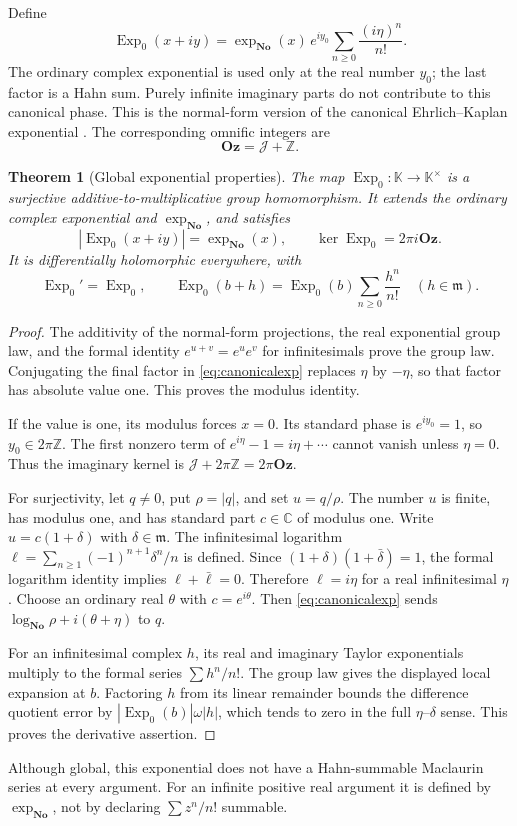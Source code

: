 \documentclass[11pt,oneside]{article}
\numberwithin{equation}{section}
\newtheorem{theorem}{Theorem}[section]
\theoremstyle{definition}
\theoremstyle{remark}\newtheorem{remark}[theorem]{Remark}
\newcommand{\No}{\mathbf{No}}
\newcommand{\Oz}{\mathbf{Oz}}
\newcommand{\K}{\mathbb K}
\newcommand{\C}{\mathbb C}
\newcommand{\Z}{\mathbb Z}
\newcommand{\m}{\mathfrak m}
\newcommand{\Exp}{\operatorname{Exp}}
\begin{document}
Define
\begin{equation}\label{eq:canonicalexp}
 \Exp_0(x+iy)
  =\exp_{\No}(x)\,e^{iy_0}
       \sum_{n\geq0}\frac{(i\eta)^n}{n!}.
\end{equation}
The ordinary complex exponential is used only at the real number $y_0$;
the last factor is a Hahn sum. Purely infinite imaginary parts do not
contribute to this canonical phase. This is the normal-form version of
the canonical Ehrlich--Kaplan exponential \cite[Theorem 11.1]{EK}.
The corresponding omnific integers are
\[
 \Oz=\mathcal J+\Z.
\]

\begin{theorem}[Global exponential properties]\label{thm:exp}
The map $\Exp_0:\K\to\K^\times$ is a surjective additive-to-multiplicative
group homomorphism. It extends the ordinary complex exponential and
$\exp_{\No}$, and satisfies
\begin{equation}\label{eq:exp-props}
 |\Exp_0(x+iy)|=\exp_{\No}(x),\qquad
 \ker\Exp_0=2\pi i\Oz.
\end{equation}
It is differentially holomorphic everywhere, with
\[
 \Exp_0'=\Exp_0,
 \qquad
 \Exp_0(b+h)=\Exp_0(b)\sum_{n\geq0}\frac{h^n}{n!}
 \quad(h\in\m).
\]
\end{theorem}
\begin{proof}
The additivity of the normal-form projections, the real exponential group
law, and the formal identity $e^{u+v}=e^ue^v$ for infinitesimals prove
the group law. Conjugating the final factor in \eqref{eq:canonicalexp}
replaces $\eta$ by $-\eta$, so that factor has absolute value one.
This proves the modulus identity.

If the value is one, its modulus forces $x=0$. Its standard phase is
$e^{iy_0}=1$, so $y_0\in2\pi\Z$. The first nonzero term of
$e^{i\eta}-1=i\eta+\cdots$ cannot vanish unless $\eta=0$.
Thus the imaginary kernel is $\mathcal J+2\pi\Z=2\pi\Oz$.

For surjectivity, let $q\ne0$, put $\rho=|q|$, and set $u=q/\rho$.
The number $u$ is finite, has modulus one, and has standard part
$c\in\C$ of modulus one. Write $u=c(1+\delta)$ with $\delta\in\m$.
The infinitesimal logarithm
$\ell=\sum_{n\geq1}(-1)^{n+1}\delta^n/n$ is defined. Since
$(1+\delta)(1+\bar\delta)=1$, the formal logarithm identity implies
$\ell+\bar\ell=0$. Therefore $\ell=i\eta$ for a real infinitesimal
$\eta$. Choose an ordinary real $\theta$ with $c=e^{i\theta}$.
Then \eqref{eq:canonicalexp} sends
$\log_{\No}\rho+i(\theta+\eta)$ to $q$.

For an infinitesimal complex $h$, its real and imaginary Taylor
exponentials multiply to the formal series $\sum h^n/n!$.
The group law gives the displayed local expansion at $b$. Factoring
$h$ from its linear remainder bounds the difference quotient error by
$|\Exp_0(b)|\omega|h|$, which tends to zero in the full
$\eta$--$\delta$ sense. This proves the derivative assertion.
\end{proof}
Although global, this exponential does not have a Hahn-summable Maclaurin
series at every argument. For an infinite positive real argument it is
defined by $\exp_{\No}$, not by declaring $\sum z^n/n!$ summable.
\end{document}
